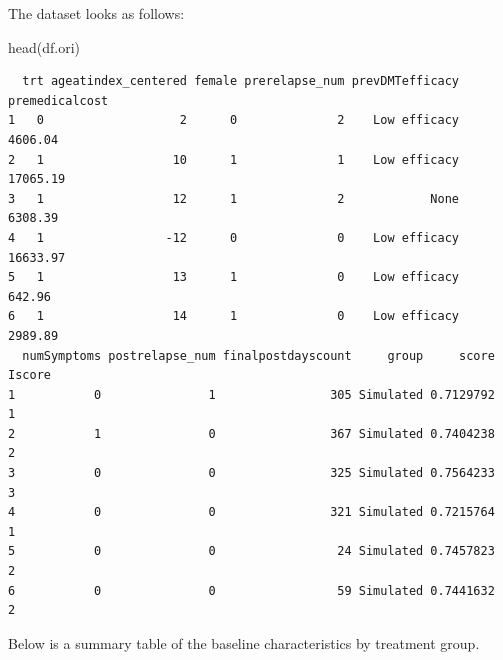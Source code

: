 \documentclass[
  letterpaper,
  DIV=11,
  numbers=noendperiod]{scrreprt}
\newenvironment{Shaded}{\begin{snugshade}}{\end{snugshade}}
\newcommand{\FunctionTok}[1]{\textcolor[rgb]{0.28,0.35,0.67}{#1}}
\newcommand{\NormalTok}[1]{\textcolor[rgb]{0.00,0.23,0.31}{#1}}
\begin{document}
The dataset looks as follows:

\begin{Shaded}
\begin{Highlighting}[]
\FunctionTok{head}\NormalTok{(df.ori)}
\end{Highlighting}
\end{Shaded}

\begin{verbatim}
  trt ageatindex_centered female prerelapse_num prevDMTefficacy premedicalcost
1   0                   2      0              2    Low efficacy        4606.04
2   1                  10      1              1    Low efficacy       17065.19
3   1                  12      1              2            None        6308.39
4   1                 -12      0              0    Low efficacy       16633.97
5   1                  13      1              0    Low efficacy         642.96
6   1                  14      1              0    Low efficacy        2989.89
  numSymptoms postrelapse_num finalpostdayscount     group     score Iscore
1           0               1                305 Simulated 0.7129792      1
2           1               0                367 Simulated 0.7404238      2
3           0               0                325 Simulated 0.7564233      3
4           0               0                321 Simulated 0.7215764      1
5           0               0                 24 Simulated 0.7457823      2
6           0               0                 59 Simulated 0.7441632      2
\end{verbatim}

Below is a summary table of the baseline characteristics by treatment
group.
\end{document}
